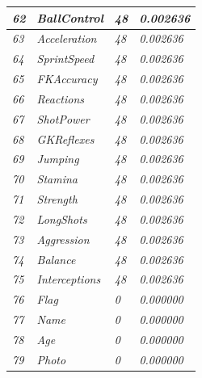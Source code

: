 \documentclass{article}
\begin{document}
\begin{table}[]
\begin{tabular}{|l|l|l|l|}
\textit{62}    & \textit{BallControl}          & \textit{48}            & \textit{0.002636}        \\ \hline
\textit{63}    & \textit{Acceleration}         & \textit{48}            & \textit{0.002636}        \\ \hline
\textit{64}    & \textit{SprintSpeed}          & \textit{48}            & \textit{0.002636}        \\ \hline
\textit{65}    & \textit{FKAccuracy}           & \textit{48}            & \textit{0.002636}        \\ \hline
\textit{66}    & \textit{Reactions}            & \textit{48}            & \textit{0.002636}        \\ \hline
\textit{67}    & \textit{ShotPower}            & \textit{48}            & \textit{0.002636}        \\ \hline
\textit{68}    & \textit{GKReflexes}           & \textit{48}            & \textit{0.002636}        \\ \hline
\textit{69}    & \textit{Jumping}              & \textit{48}            & \textit{0.002636}        \\ \hline
\textit{70}    & \textit{Stamina}              & \textit{48}            & \textit{0.002636}        \\ \hline
\textit{71}    & \textit{Strength}             & \textit{48}            & \textit{0.002636}        \\ \hline
\textit{72}    & \textit{LongShots}            & \textit{48}            & \textit{0.002636}        \\ \hline
\textit{73}    & \textit{Aggression}           & \textit{48}            & \textit{0.002636}        \\ \hline
\textit{74}    & \textit{Balance}              & \textit{48}            & \textit{0.002636}        \\ \hline
\textit{75}    & \textit{Interceptions}        & \textit{48}            & \textit{0.002636}        \\ \hline
\textit{76}    & \textit{Flag}                 & \textit{0}             & \textit{0.000000}        \\ \hline
\textit{77}    & \textit{Name}                 & \textit{0}             & \textit{0.000000}        \\ \hline
\textit{78}    & \textit{Age}                  & \textit{0}             & \textit{0.000000}        \\ \hline
\textit{79}    & \textit{Photo}                & \textit{0}             & \textit{0.000000}        \\ \hline

\end{tabular}
\end{table}
\end{document}
